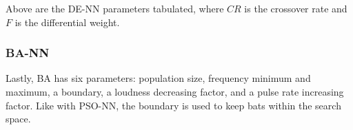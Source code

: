 \documentclass[a4paper,12pt]{article}
\begin{document}
\begin{table}[h!]
\centering
{}
\caption{Differential evolution parameters.}
\label{Tab:de-par}
\end{table}

Above are the DE-NN parameters tabulated, where $CR$ is the crossover rate and $F$ is the differential weight.

\subsubsection{BA-NN}

Lastly, BA has six parameters: population size, frequency minimum and maximum, a boundary, a loudness decreasing factor, and a pulse rate increasing factor. Like with PSO-NN, the boundary is used to keep bats within the search space.

\begin{table}[h!]
\centering
{}
\caption{Bat algorithm parameters.}
\label{Tab:ba-par}
\end{table}
\end{document}
